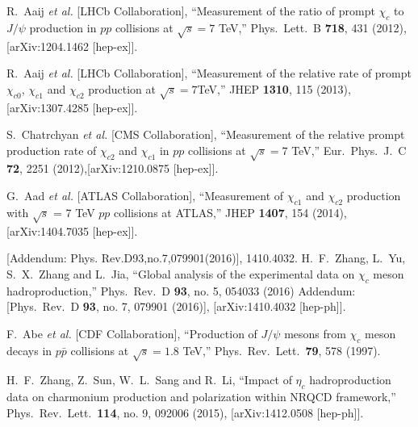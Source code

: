 \documentclass[aps,prc,preprint,superscriptaddress,showpacs,showkeys,amsmath]{revtex4-1}
\begin{document}
\begin{thebibliography}{100}

  R.~Aaij {\it et al.} [LHCb Collaboration],
  ``Measurement of the ratio of prompt $\chi_{c}$ to $J/\psi$ production in $pp$ collisions at $\sqrt{s}=7$ TeV,''
  Phys.\ Lett.\ B {\bf 718}, 431 (2012),[arXiv:1204.1462 [hep-ex]].


  R.~Aaij {\it et al.} [LHCb Collaboration],
  ``Measurement of the relative rate of prompt $\chi_{c0}$, $\chi_{c1}$ and $\chi_{c2}$ production at $\sqrt{s}=7$TeV,''
  JHEP {\bf 1310}, 115 (2013), [arXiv:1307.4285 [hep-ex]].
 
  S.~Chatrchyan {\it et al.} [CMS Collaboration],
  ``Measurement of the relative prompt production rate of $\chi_{c2}$ and $\chi_{c1}$ 
  in $pp$ collisions at $\sqrt{s}=7$ TeV,''
  Eur.\ Phys.\ J.\ C {\bf 72}, 2251 (2012),[arXiv:1210.0875 [hep-ex]].



  G.~Aad {\it et al.} [ATLAS Collaboration],
  ``Measurement of $\chi_{c1}$ and $\chi_{c2}$ production with $\sqrt{s}$ = 7 TeV $pp$ collisions at ATLAS,''
  JHEP {\bf 1407}, 154 (2014), [arXiv:1404.7035 [hep-ex]].

 [Addendum: Phys. Rev.D93,no.7,079901(2016)], 1410.4032.
  H.~F.~Zhang, L.~Yu, S.~X.~Zhang and L.~Jia,
  ``Global analysis of the experimental data on $\chi_c$ meson hadroproduction,''
  Phys.\ Rev.\ D {\bf 93}, no. 5, 054033 (2016) Addendum: [Phys.\ Rev.\ D {\bf 93}, no. 7, 079901 (2016)], 
  [arXiv:1410.4032 [hep-ph]].

  F.~Abe {\it et al.} [CDF Collaboration],
  ``Production of $J/\psi$ mesons from $\chi_c$ meson decays in $p\bar{p}$ collisions at $\sqrt{s} = 1.8$ TeV,''
  Phys.\ Rev.\ Lett.\  {\bf 79}, 578 (1997).


  H.~F.~Zhang, Z.~Sun, W.~L.~Sang and R.~Li,
  ``Impact of $\eta_c$ hadroproduction data on charmonium production and polarization within NRQCD framework,''
  Phys.\ Rev.\ Lett.\  {\bf 114}, no. 9, 092006 (2015), [arXiv:1412.0508 [hep-ph]].
  



\end{thebibliography}
\end{document}
